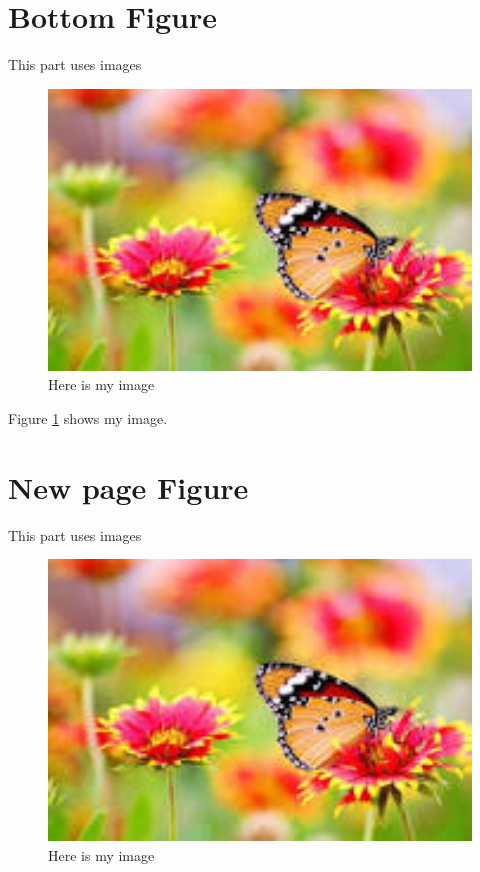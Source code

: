 \documentclass[a4paper,12pt]{article}
\begin{document}
{\section{Bottom Figure}
This part uses images\newline
\begin{figure}[b!]
\centering
\includegraphics[width=1\textwidth]{myimage}
\caption{Here is my image}
\label{image-myimage1}
\end{figure}

Figure \ref{image-myimage1} shows my image.

\newpage

\section{New page Figure}
This part uses images\newline
\begin{figure}[p!]
\centering
\includegraphics[width=1\textwidth]{myimage}
\caption{Here is my image}
\label{image-myimage2}
\end{figure}

}
\end{document}
